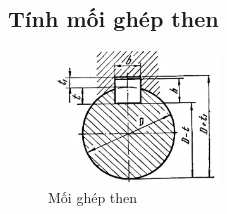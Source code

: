         \subsection{Tính mối ghép then}
            \begin{figure}[H]
                \centering
                \includegraphics[width=0.4\textwidth]{pictures/key.png}
                \caption{Mối ghép then}
                \label{fig:key}
            \end{figure}

